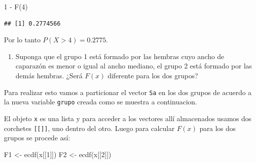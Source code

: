 \documentclass[
]{book}
\makeatletter
\newenvironment{Shaded}{\begin{snugshade}}{\end{snugshade}}
\newcommand{\AttributeTok}[1]{\textcolor[rgb]{0.77,0.63,0.00}{#1}}
\newcommand{\DecValTok}[1]{\textcolor[rgb]{0.00,0.00,0.81}{#1}}
\newcommand{\FunctionTok}[1]{\textcolor[rgb]{0.00,0.00,0.00}{#1}}
\newcommand{\NormalTok}[1]{#1}
\newcommand{\OtherTok}[1]{\textcolor[rgb]{0.56,0.35,0.01}{#1}}
\newcommand{\SpecialCharTok}[1]{\textcolor[rgb]{0.00,0.00,0.00}{#1}}
\newcommand{\StringTok}[1]{\textcolor[rgb]{0.31,0.60,0.02}{#1}}
\providecommand{\tightlist}{%
  \setlength{\itemsep}{0pt}\setlength{\parskip}{0pt}}
\newenvironment{kframe}{%
\medskip{}
\setlength{\fboxsep}{.8em}
 \def\at@end@of@kframe{}%
 \ifinner\ifhmode%
  \def\at@end@of@kframe{\end{minipage}}%
  \begin{minipage}{\columnwidth}%
 \fi\fi%
 \def\FrameCommand##1{\hskip\@totalleftmargin \hskip-\fboxsep
 \colorbox{shadecolor}{##1}\hskip-\fboxsep
     \hskip-\linewidth \hskip-\@totalleftmargin \hskip\columnwidth}%
 \MakeFramed {\advance\hsize-\width
   \@totalleftmargin\z@ \linewidth\hsize
   \@setminipage}}%
 {\par\unskip\endMakeFramed%
 \at@end@of@kframe}
\renewenvironment{Shaded}{\begin{kframe}}{\end{kframe}}
\makeatother
\begin{document}
\begin{Shaded}
\begin{Highlighting}[]
\DecValTok{1} \SpecialCharTok{{-}} \FunctionTok{F}\NormalTok{(}\DecValTok{4}\NormalTok{)}
\end{Highlighting}
\end{Shaded}

\begin{verbatim}
## [1] 0.2774566
\end{verbatim}

Por lo tanto \(P(X > 4)=0.2775\).

\begin{enumerate}
\def\labelenumi{\arabic{enumi})}
\setcounter{enumi}{4}
\tightlist
\item
  Suponga que el grupo 1 está formado por las hembras cuyo ancho de caparazón es menor o igual al ancho mediano, el grupo 2 está formado por las demás hembras. ¿Será \(F(x)\) diferente para los dos grupos?
\end{enumerate}

Para realizar esto vamos a particionar el vector \texttt{Sa} en los dos grupos de acuerdo a la nueva variable \texttt{grupo} creada como se muestra a continuacion.

\begin{Shaded}
\end{Shaded}

El objeto \texttt{x} es una lista y para acceder a los vectores allí almacenados usamos dos corchetes \texttt{{[}{[}{]}{]}}, uno dentro del otro. Luego para calcular \(F(x)\) para los dos grupos se procede así:

\begin{Shaded}
\begin{Highlighting}[]
\NormalTok{F1 }\OtherTok{\textless{}{-}} \FunctionTok{ecdf}\NormalTok{(x[[}\DecValTok{1}\NormalTok{]])}
\NormalTok{F2 }\OtherTok{\textless{}{-}} \FunctionTok{ecdf}\NormalTok{(x[[}\DecValTok{2}\NormalTok{]])}
\end{Highlighting}
\end{Shaded}
\end{document}
